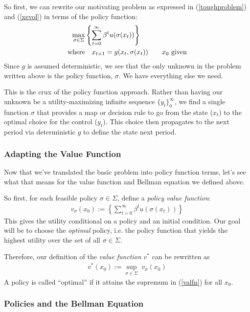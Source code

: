 \documentclass[a4paper,12pt]{scrartcl}
\begin{document}
So first, we can rewrite our motivating problem as
expressed in (\ref{toughproblem}) and (\ref{xevol}) in
terms of the policy function:
\begin{align}
  \label{policyapproach}
  \max_{\sigma \in \Sigma} 
  &\left\{ \sum^\infty_{t=0} \beta^t u(\sigma(x_t)) \right\}\\
  \text{where} &\quad
  x_{t+1} = g(x_t, \sigma(x_t)) 
  \qquad \text{$x_0$ given}
  \notag
\end{align}
Since $g$ is assumed deterministic, we see that the only
unknown in the problem written above is the policy
function, $\sigma$. We have everything else we need.

This is the crux of the policy function approach.
Rather than having our unknown be a utility-maximizing
infinite sequence $\{y_t\}^\infty_0$, we find a single
function $\sigma$ that provides a map or decision rule to
go from the state ($x_t$) to the optimal choice for the
control ($y_t$).  This choice then propagates to the next
period via deterministic $g$ to define the state next
period.

\subsubsection{Adapting the Value Function}

Now that we've translated the basic problem into policy
function terms, let's see what that means for the value
function and Bellman equation we defined above.

So first, for each feasible policy $\sigma\in
\Sigma$, define a \emph{policy value
function}:
\begin{align*}
  v_\sigma(x_0) :=
  \left\{ \sum^\infty_{t=0} \beta^t u(\sigma(x_t)) \right\}
\end{align*}
This gives the utility conditional on a policy and an initial condition.
Our goal will be to choose the \emph{optimal} policy, i.e. the policy
function that yields the highest utility over the set of all $\sigma \in
\Sigma$.

Therefore, our definition of the \emph{value function} $v^*$ can
be rewritten as
\begin{align}
  \label{valfn}
  v^*(x_0) := \sup_{\sigma\in\Sigma} \; v_\sigma(x_0)
\end{align}
A policy is called ``optimal'' if it attains the supremum in
(\ref{valfn}) for all $x_0$. 

\subsubsection{Policies and the Bellman Equation}
\end{document}
